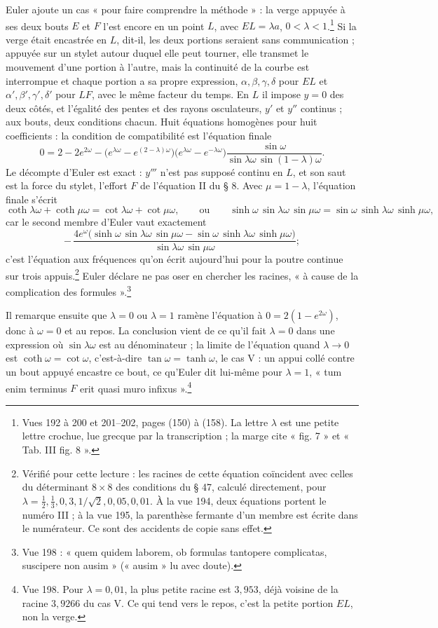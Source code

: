 \documentclass[11pt,a4paper]{article}
\begin{document}
Euler ajoute un cas « pour faire comprendre la méthode » : la verge appuyée à ses deux bouts $E$ et $F$ l'est encore en un point $L$, avec $EL=\lambda a$, $0<\lambda<1$.\footnote{Vues 192 à 200 et 201--202, pages (150) à (158). La lettre $\lambda$ est une petite lettre crochue, lue grecque par la transcription ; la marge cite « fig. 7 » et « Tab. III fig. 8 ».} Si la verge était encastrée en $L$, dit-il, les deux portions seraient sans communication ; appuyée sur un stylet autour duquel elle peut tourner, elle transmet le mouvement d'une portion à l'autre, mais la continuité de la courbe est interrompue et chaque portion a sa propre expression, $\alpha,\beta,\gamma,\delta$ pour $EL$ et $\alpha',\beta',\gamma',\delta'$ pour $LF$, avec le même facteur du temps. En $L$ il impose $y=0$ des deux côtés, et l'égalité des pentes et des rayons osculateurs, $y'$ et $y''$ continus ; aux bouts, deux conditions chacun. Huit équations homogènes pour huit coefficients : la condition de compatibilité est l'équation finale
\[
0=2-2e^{2\omega}-\bigl(e^{\lambda\omega}-e^{(2-\lambda)\omega}\bigr)\bigl(e^{\lambda\omega}-e^{-\lambda\omega}\bigr)\frac{\sin\omega}{\sin\lambda\omega\,\sin(1-\lambda)\omega}.
\]
Le décompte d'Euler est exact : $y'''$ n'est pas supposé continu en $L$, et son saut est la force du stylet, l'effort $F$ de l'équation II du § 8. Avec $\mu=1-\lambda$, l'équation finale s'écrit
\[
\coth\lambda\omega+\coth\mu\omega=\cot\lambda\omega+\cot\mu\omega,
\qquad\text{ou}\qquad
\sinh\omega\,\sin\lambda\omega\,\sin\mu\omega=\sin\omega\,\sinh\lambda\omega\,\sinh\mu\omega,
\]
car le second membre d'Euler vaut exactement
\[
-\,\frac{4e^\omega\bigl(\sinh\omega\,\sin\lambda\omega\,\sin\mu\omega-\sin\omega\,\sinh\lambda\omega\,\sinh\mu\omega\bigr)}{\sin\lambda\omega\,\sin\mu\omega} ;
\]
c'est l'équation aux fréquences qu'on écrit aujourd'hui pour la poutre continue sur trois appuis.\footnote{Vérifié pour cette lecture : les racines de cette équation coïncident avec celles du déterminant $8\times8$ des conditions du § 47, calculé directement, pour $\lambda=\frac12,\frac13,0{,}3,1/\sqrt2,0{,}05,0{,}01$. À la vue 194, deux équations portent le numéro III ; à la vue 195, la parenthèse fermante d'un membre est écrite dans le numérateur. Ce sont des accidents de copie sans effet.} Euler déclare ne pas oser en chercher les racines, « à cause de la complication des formules ».\footnote{Vue 198 : « quem quidem laborem, ob formulas tantopere complicatas, suscipere non ausim » (« ausim » lu avec doute).}

Il remarque ensuite que $\lambda=0$ ou $\lambda=1$ ramène l'équation à $0=2(1-e^{2\omega})$, donc à $\omega=0$ et au repos. La conclusion vient de ce qu'il fait $\lambda=0$ dans une expression où $\sin\lambda\omega$ est au dénominateur ; la limite de l'équation quand $\lambda\to0$ est $\coth\omega=\cot\omega$, c'est-à-dire $\tan\omega=\tanh\omega$, le cas V : un appui collé contre un bout appuyé encastre ce bout, ce qu'Euler dit lui-même pour $\lambda=1$, « tum enim terminus $F$ erit quasi muro infixus ».\footnote{Vue 198. Pour $\lambda=0{,}01$, la plus petite racine est $3{,}953$, déjà voisine de la racine $3{,}9266$ du cas V. Ce qui tend vers le repos, c'est la petite portion $EL$, non la verge.}
\end{document}
